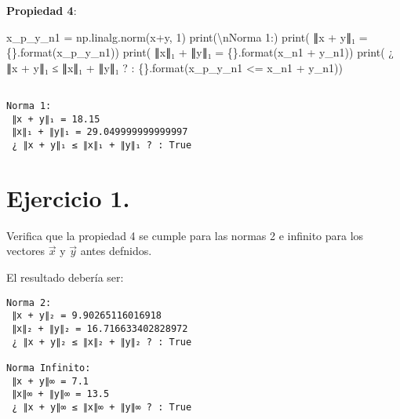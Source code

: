 \documentclass[
  letterpaper,
  DIV=11,
  numbers=noendperiod]{scrreprt}
\newenvironment{Shaded}{\begin{snugshade}}{\end{snugshade}}
\newcommand{\BuiltInTok}[1]{\textcolor[rgb]{0.00,0.23,0.31}{#1}}
\newcommand{\CharTok}[1]{\textcolor[rgb]{0.13,0.47,0.30}{#1}}
\newcommand{\DecValTok}[1]{\textcolor[rgb]{0.68,0.00,0.00}{#1}}
\newcommand{\NormalTok}[1]{\textcolor[rgb]{0.00,0.23,0.31}{#1}}
\newcommand{\OperatorTok}[1]{\textcolor[rgb]{0.37,0.37,0.37}{#1}}
\newcommand{\SpecialCharTok}[1]{\textcolor[rgb]{0.37,0.37,0.37}{#1}}
\newcommand{\StringTok}[1]{\textcolor[rgb]{0.13,0.47,0.30}{#1}}
\begin{document}
\textbf{Propiedad 4}:

\begin{Shaded}
\begin{Highlighting}[]
\NormalTok{x\_p\_y\_n1 }\OperatorTok{=}\NormalTok{ np.linalg.norm(x}\OperatorTok{+}\NormalTok{y, }\DecValTok{1}\NormalTok{)}
\BuiltInTok{print}\NormalTok{(}\StringTok{\textquotesingle{}}\CharTok{\textbackslash{}n}\StringTok{Norma 1:\textquotesingle{}}\NormalTok{)}
\BuiltInTok{print}\NormalTok{(}\StringTok{\textquotesingle{} ∥x + y∥₁ = }\SpecialCharTok{\{\}}\StringTok{\textquotesingle{}}\NormalTok{.}\BuiltInTok{format}\NormalTok{(x\_p\_y\_n1))}
\BuiltInTok{print}\NormalTok{(}\StringTok{\textquotesingle{} ∥x∥₁ + ∥y∥₁ = }\SpecialCharTok{\{\}}\StringTok{\textquotesingle{}}\NormalTok{.}\BuiltInTok{format}\NormalTok{(x\_n1 }\OperatorTok{+}\NormalTok{ y\_n1))}
\BuiltInTok{print}\NormalTok{(}\StringTok{\textquotesingle{} ¿ ∥x + y∥₁ ≤ ∥x∥₁ + ∥y∥₁ ? : }\SpecialCharTok{\{\}}\StringTok{\textquotesingle{}}\NormalTok{.}\BuiltInTok{format}\NormalTok{(x\_p\_y\_n1 }\OperatorTok{\textless{}=}\NormalTok{ x\_n1 }\OperatorTok{+}\NormalTok{ y\_n1))}
\end{Highlighting}
\end{Shaded}

\begin{verbatim}

Norma 1:
 ∥x + y∥₁ = 18.15
 ∥x∥₁ + ∥y∥₁ = 29.049999999999997
 ¿ ∥x + y∥₁ ≤ ∥x∥₁ + ∥y∥₁ ? : True
\end{verbatim}

\section{\texorpdfstring{\textbf{Ejercicio
1.}}{Ejercicio 1.}}\label{ejercicio-1.-3}

Verifica que la propiedad 4 se cumple para las normas 2 e infinito para
los vectores \(\vec{x}\) y \(\vec{y}\) antes defnidos.

El resultado debería ser:

\begin{verbatim}
Norma 2:
 ∥x + y∥₂ = 9.90265116016918
 ∥x∥₂ + ∥y∥₂ = 16.716633402828972
 ¿ ∥x + y∥₂ ≤ ∥x∥₂ + ∥y∥₂ ? : True

Norma Infinito:
 ∥x + y∥∞ = 7.1
 ∥x∥∞ + ∥y∥∞ = 13.5
 ¿ ∥x + y∥∞ ≤ ∥x∥∞ + ∥y∥∞ ? : True
\end{verbatim}
\end{document}
